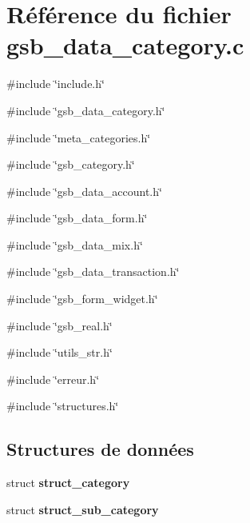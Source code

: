 \section{Référence du fichier gsb\_\-data\_\-category.c}
\label{gsb__data__category_8c}
{\ttfamily \#include \char`\"{}include.h\char`\"{}}\par
{\ttfamily \#include \char`\"{}gsb\_\-data\_\-category.h\char`\"{}}\par
{\ttfamily \#include \char`\"{}meta\_\-categories.h\char`\"{}}\par
{\ttfamily \#include \char`\"{}gsb\_\-category.h\char`\"{}}\par
{\ttfamily \#include \char`\"{}gsb\_\-data\_\-account.h\char`\"{}}\par
{\ttfamily \#include \char`\"{}gsb\_\-data\_\-form.h\char`\"{}}\par
{\ttfamily \#include \char`\"{}gsb\_\-data\_\-mix.h\char`\"{}}\par
{\ttfamily \#include \char`\"{}gsb\_\-data\_\-transaction.h\char`\"{}}\par
{\ttfamily \#include \char`\"{}gsb\_\-form\_\-widget.h\char`\"{}}\par
{\ttfamily \#include \char`\"{}gsb\_\-real.h\char`\"{}}\par
{\ttfamily \#include \char`\"{}utils\_\-str.h\char`\"{}}\par
{\ttfamily \#include \char`\"{}erreur.h\char`\"{}}\par
{\ttfamily \#include \char`\"{}structures.h\char`\"{}}\par
\subsection*{Structures de données}
\begin{DoxyCompactItemize}
\item 
struct {\bf struct\_\-category}
\item 
struct {\bf struct\_\-sub\_\-category}
\end{DoxyCompactItemize}
